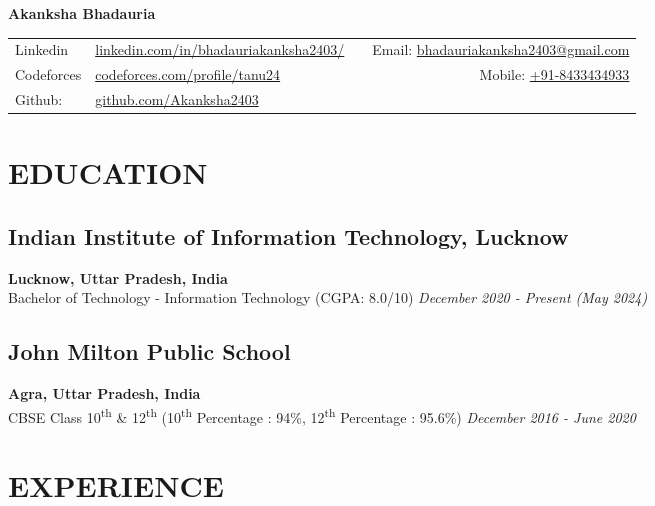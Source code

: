 \documentclass[12pt]{article}
\newcommand{\resumename}[1]{\LARGE\textbf{#1} \hfill \small}
\begin{document}
\noindent
\resumename{Akanksha Bhadauria}
\begin{table}[h]
\centering
\begin{tabularx}{\textwidth}{@{}llXr}
Linkedin & \href{https://www.linkedin.com/in/bhadauriakanksha2403/}{linkedin.com/in/bhadauriakanksha2403/} &   & Email: \href{mailto:bhadauriakanksha2403@gmail.com}{bhadauriakanksha2403@gmail.com}      \\                                 
  Codeforces & \href{https://codeforces.com/profile/tanu24}{codeforces.com/profile/tanu24}  & 
  & Mobile: \href{tel:+918433434933}{+91-8433434933}             \\
  Github: & \href{https://github.com/akanksha2403}{github.com/Akanksha2403}                                    \\
\end{tabularx}
\end{table}
\vspace{-10pt}
\section*{EDUCATION}
\subsection*{Indian Institute of Information Technology, Lucknow}      \hfill \textbf{Lucknow, Uttar Pradesh, India} \\
Bachelor of Technology - Information Technology (CGPA: 8.0/10) \hfill \textit{December 2020 - Present (May 2024)} \\
\subsection*{John Milton Public School}                       \hfill \textbf{Agra, Uttar Pradesh, India} \\
CBSE Class 10\textsuperscript{th} \& 12\textsuperscript{th} (10\textsuperscript{th} Percentage : 94\%, 12\textsuperscript{th} Percentage : 95.6\%) \hfill \textit{December 2016 - June 2020} \\ 

\section*{EXPERIENCE}
\end{document}
